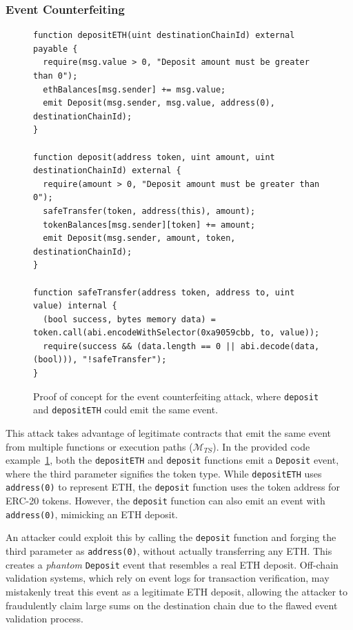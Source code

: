 \subsubsection{Event Counterfeiting}\label{vec:attack1}

\begin{figure}
\small
\footnotesize
\begin{lstlisting}[language=Solidity]
function depositETH(uint destinationChainId) external payable {
  require(msg.value > 0, "Deposit amount must be greater than 0");
  ethBalances[msg.sender] += msg.value;
  emit Deposit(msg.sender, msg.value, address(0), destinationChainId);
}

function deposit(address token, uint amount, uint destinationChainId) external {
  require(amount > 0, "Deposit amount must be greater than 0");
  safeTransfer(token, address(this), amount);
  tokenBalances[msg.sender][token] += amount;
  emit Deposit(msg.sender, amount, token, destinationChainId);
}

function safeTransfer(address token, address to, uint value) internal {
  (bool success, bytes memory data) = token.call(abi.encodeWithSelector(0xa9059cbb, to, value));
  require(success && (data.length == 0 || abi.decode(data, (bool))), "!safeTransfer");
}
\end{lstlisting}
\caption{Proof of concept for the event counterfeiting attack, where \texttt{deposit} and
\texttt{depositETH} could emit the same event.}\label{code:1}
\end{figure}

This attack takes advantage of legitimate contracts that emit the same event from multiple functions or execution paths (\(\bm{\mathcal{M}}_{TS}\)). In the provided code example~\cref{code:1}, both the \texttt{depositETH} and \texttt{deposit} functions emit a \texttt{Deposit} event, where the third parameter signifies the token type. While \texttt{depositETH} uses \texttt{address(0)} to represent ETH, the \texttt{deposit} function uses the token address for ERC-20 tokens. However, the \texttt{deposit} function can also emit an event with \texttt{address(0)}, mimicking an ETH deposit.

An attacker could exploit this by calling the \texttt{deposit} function and forging the third parameter as \texttt{address(0)}, without actually transferring any ETH. This creates a \emph{phantom} \texttt{Deposit} event that resembles a real ETH deposit. Off-chain validation systems, which rely on event logs for transaction verification, may mistakenly treat this event as a legitimate ETH deposit, allowing the attacker to fraudulently claim large sums on the destination chain due to the flawed event validation process.


